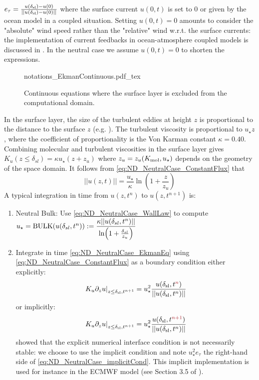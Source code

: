 $e_\tau = \frac{u(\delta_{\rm sl})-u(0)}
	{||u(\delta_{\rm sl})-u(0)||}$
where the surface current $u(0, t)$ is set to 0 or given by
the ocean model in a coupled situation.
Setting $u(0,t)=0$ amounts to consider the "absolute" wind speed
rather than the "relative" wind w.r.t. the surface currents:
the implementation of current feedbacks in ocean-atmosphere
coupled models is discussed in \cite{renault_implementation_2019}.
In the neutral case we assume $u(0,t)=0$ to shorten the expressions.
%
\begin{figure}
	\centering
	{notations_EkmanContinuous.pdf_tex}
	\caption{Continuous equations where the surface layer
	is excluded from the computational domain.}
	\label{fig:ND_NeutralCase_EkmanContinuous}
\end{figure}
\par
In the surface layer, the size of the turbulent eddies at height $z$
is proportional to the distance to the surface $z$
(e.g. \cite{kawai_wall-modeling_2012}). The turbulent viscosity
is proportional to $u_\star z$, where the coefficient of
proportionality is the Von Karman constant $\kappa = 0.40$.
Combining molecular and turbulent viscosities in the surface layer
gives $K_u(z\leq \delta_{sl}) = \kappa u_\star (z + z_{u})$ where
$z_{u} = z_u({K_{{\rm mol}}}, u_\star)$ depends on the
geometry of the space domain.
It follows from \eqref{eq:ND_NeutralCase_ConstantFlux} that
\begin{equation}
\label{eq:ND_NeutralCase_WallLaw}
	||u(z, t)|| = \frac{{u_\star}}{\kappa}
	\ln(1+\frac{z}{z_{u}})
\end{equation}
A typical integration in time from $u(z, t^{n})$ to
$u(z, t^{n+1})$ is:
\begin{enumerate}
	\item Neutral Bulk: Use \eqref{eq:ND_NeutralCase_WallLaw}
		to compute $u_\star = {\rm BULK}(u(\delta_{sl}, t^n))
		:= \displaystyle \frac{\kappa ||u(\delta_{sl}, t^n)||}
			{\ln(1+\frac{\delta_{sl}}{z_{u}})}$
  \item Integrate in time \eqref{eq:ND_NeutralCase_EkmanEq}
  using \eqref{eq:ND_NeutralCase_ConstantFlux} as a boundary condition
		either explicitly: 
	\begin{equation}
		\left.K_u \partial_z u
		\right|_{z\leq \delta_{\rm sl}, t^{n+1}}
		= u_\star^2 \frac{u(\delta_{\rm sl},
		t^{\emphase{n}})}
		{||u(\delta_{\rm sl}, t^n)||}
	\end{equation}
		or implicitly:
	\begin{equation}
		\label{eq:ND_NeutralCase_implicitCond}
		\left.K_u \partial_z u
		\right|_{z\leq \delta_{\rm sl}, t^{n+1}}
		= u_\star^2 \frac{u(\delta_{\rm sl},
		t^{\emphase{n+1}})}
		{||u(\delta_{\rm sl}, t^n)||}
	\end{equation}
	\cite{lemarie_stability_2015} showed that the explicit
	numerical interface condition is not necessarily
	stable: we choose to use the implicit condition and note
		$u_\star^2 e_\tau$ the right-hand side of
		\eqref{eq:ND_NeutralCase_implicitCond}.
	This implicit implementation is used for instance in the
	ECMWF model (see Section 3.5 of \citep{ecmwf_ifs_2020}).
\end{enumerate}

